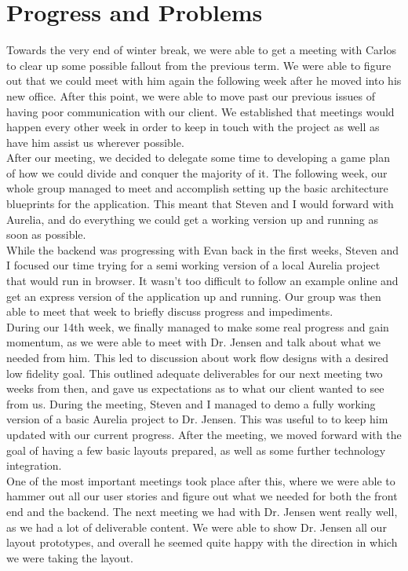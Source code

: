 \documentclass[onecolumn, draftclsnofoot,10pt, compsoc]{IEEEtran}
\begin{document}
\section{Progress and Problems}
Towards the very end of winter break, we were able to get a meeting with Carlos to clear
up some possible fallout from the previous term. We were able to figure out that we could meet with
him again the following week after he moved into his new office. After this point, we were able to 
move past our previous issues of having poor communication with our client. We established that meetings 
would happen every other week in order to keep in touch with the project as well as have him assist us 
wherever possible. \\

After our meeting, we decided to delegate some time to developing a game plan of how we
could divide and conquer the majority of it. The following week, our whole group 
managed to meet and accomplish setting up the basic architecture blueprints for the 
application. This meant that Steven and I would forward with Aurelia, and do 
everything we could get a working version up and running as soon as possible. \\

While the backend was progressing with Evan back in the first weeks, Steven and I focused our time 
trying for a semi working version of a local Aurelia project that would run in browser. 
It wasn't too difficult to follow an example online and get an express version of the 
application up and running. Our group was then able to meet that week to briefly discuss 
progress and impediments. \\

During our 14th week, we finally managed to make some real progress and gain momentum, as
we were able to meet with Dr. Jensen and talk about what we needed from him. This led to discussion 
about work flow designs with a desired low fidelity goal. This outlined adequate deliverables for 
our next meeting two weeks from then, and gave us expectations as to what our client wanted to 
see from us. During the meeting, Steven and I managed to demo a fully working version of a basic 
Aurelia project to Dr. Jensen. This was useful to to keep him updated with our current progress. 
After the meeting, we moved forward with the goal of having a few basic layouts prepared, as well
as some further technology integration.\\

One of the most important meetings took place after this, where we were able to hammer out 
all our user stories and figure out what we needed for both the front end and the backend. The next 
meeting we had with Dr. Jensen went really well, as we had a lot of deliverable content. We were able 
to show Dr. Jensen all our layout prototypes, and overall he seemed quite happy with the direction in 
which we were taking the layout. \\
\end{document}
